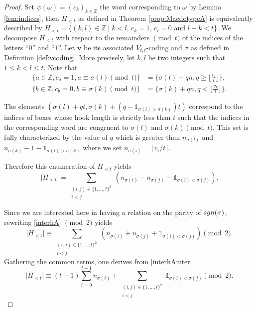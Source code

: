 \documentclass[11pt,letterpaper]{amsart}
\def\bbbz{\mathbb Z}
\def\sgn{{\rm sgn}}
\DeclareMathOperator{\I}{I}
\newcommand{\Z}{\mathbb{Z}}
\numberwithin{equation}{section}
\numberwithin{df}{section}
\begin{document}
\begin{proof}
Set $\psi(\omega)=(c_k)_{k\in\bbbz}$ the word corresponding to $\omega$ by Lemma \ref{lem:indices}, then $H_{<t}$ as defined in Theorem \ref{prop:MacdotypeA} is equivalently described by $H_{<t}=\lbrace (k,l)\in\bbbz \mid k<l,\, c_k=1,\, c_l=0 \text{ and } l-k<t\rbrace$. We decompose $H_{<t}$ with respect to the remainders $\pmod{t}$ of the indices of the letters ``$0$'' and ``$1$''. Let $\mathbf{v}$ be its associated $V_{t,t}$-coding and $\sigma$ as defined in Definition \ref{def:vcoding}.
More precisely, let $k,l$ be two integers such that $1\leq k <l \leq t$. Note that
\begin{align*}
\lbrace a\in \Z, c_{a}=1, a\equiv \sigma(l)\pmod{t}\rbrace&=\lbrace \sigma(l)+qn,q\geq \lfloor\frac{v_l}{t}\rfloor\rbrace,\\
\lbrace b\in \Z, c_{b}=0, b\equiv \sigma(k)\pmod{t}\rbrace&=\lbrace \sigma(k)+qn,q< \lfloor\frac{v_k}{t}\rfloor\rbrace.
\end{align*}

The elements $(\sigma(l)+qt,\sigma(k)+(q-\mathds{1}_{\sigma(l)>\sigma(k)})t)$ correspond to the indices of boxes whose hook length is strictly less than $t$ such that the indices in the corresponding word are congruent to $\sigma(l)$ and $\sigma(k)\pmod{t}$. This set is fully characterized by the value of $q$ which is greater than $n_{\sigma(l)}$ and $n_{\sigma(k)}-1-\mathds{1}_{\sigma(l)>\sigma(k)}$ where we set $n_{\sigma(i)}=\lfloor v_i/t\rfloor$.

Therefore this enumeration of $H_{<t}$ yields
\begin{equation}\label{interhA}
\lvert H_{<t}\rvert=\sum_{\substack{(i,j)\in \lbrace 1,\dots ,t\rbrace^2\\i<j}}\left(n_{\sigma(i)}-n_{\sigma(j)}-\mathds{1}_{\sigma(i)<\sigma(j)}\right).
\end{equation}

Since we are interested here in having a relation on the parity of $\sgn(\sigma)$, rewriting \eqref{interhA} $\pmod{2}$ yields
\begin{equation}\label{interhAinter}
\lvert H_{<t}\rvert\equiv\sum_{\substack{(i,j)\in \lbrace 1,\dots ,t\rbrace^2\\i<j}}\left(n_{\sigma(i)}+n_{\sigma(j)}+\mathds{1}_{\sigma(i)<\sigma(j)}\right)\pmod {2}.
\end{equation}
Gathering the common terms, one derives from \eqref{interhAinter}
\begin{equation*}
\lvert H_{<t}\rvert\equiv(t-1)\sum_{i=0}^{t-1} n_{\sigma(i)}+\sum_{\substack{(i,j)\in \lbrace 1,\dots ,t\rbrace^2\\i<j}}\mathds{1}_{\sigma(i)<\sigma(j)}\pmod{2}.
\end{equation*}


\end{proof}
\end{document}
